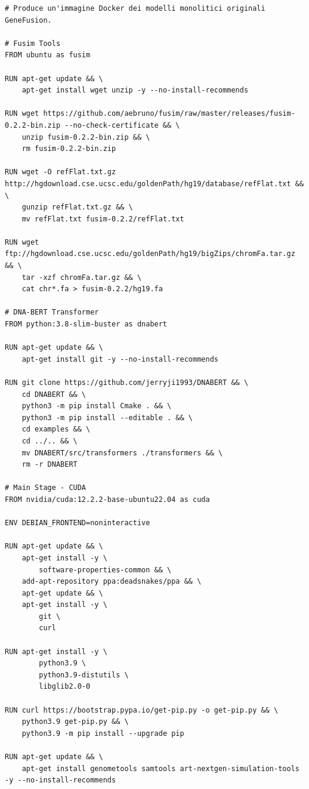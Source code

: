 \begin{code}
\label{code:apx:a:dockerfile}
\begin{verbatim}
# Produce un'immagine Docker dei modelli monolitici originali GeneFusion.

# Fusim Tools
FROM ubuntu as fusim

RUN apt-get update && \
    apt-get install wget unzip -y --no-install-recommends

RUN wget https://github.com/aebruno/fusim/raw/master/releases/fusim-0.2.2-bin.zip --no-check-certificate && \
    unzip fusim-0.2.2-bin.zip && \
    rm fusim-0.2.2-bin.zip

RUN wget -O refFlat.txt.gz http://hgdownload.cse.ucsc.edu/goldenPath/hg19/database/refFlat.txt && \
    gunzip refFlat.txt.gz && \
    mv refFlat.txt fusim-0.2.2/refFlat.txt

RUN wget ftp://hgdownload.cse.ucsc.edu/goldenPath/hg19/bigZips/chromFa.tar.gz && \
    tar -xzf chromFa.tar.gz && \
    cat chr*.fa > fusim-0.2.2/hg19.fa

# DNA-BERT Transformer
FROM python:3.8-slim-buster as dnabert

RUN apt-get update && \
    apt-get install git -y --no-install-recommends

RUN git clone https://github.com/jerryji1993/DNABERT && \
    cd DNABERT && \
    python3 -m pip install Cmake . && \
    python3 -m pip install --editable . && \
    cd examples && \
    cd ../.. && \
    mv DNABERT/src/transformers ./transformers && \
    rm -r DNABERT

# Main Stage - CUDA
FROM nvidia/cuda:12.2.2-base-ubuntu22.04 as cuda

ENV DEBIAN_FRONTEND=noninteractive

RUN apt-get update && \
    apt-get install -y \
        software-properties-common && \
    add-apt-repository ppa:deadsnakes/ppa && \
    apt-get update && \
    apt-get install -y \
        git \
        curl

RUN apt-get install -y \ 
        python3.9 \
        python3.9-distutils \
        libglib2.0-0

RUN curl https://bootstrap.pypa.io/get-pip.py -o get-pip.py && \
    python3.9 get-pip.py && \
    python3.9 -m pip install --upgrade pip

RUN apt-get update && \
    apt-get install genometools samtools art-nextgen-simulation-tools -y --no-install-recommends


\end{verbatim}
\end{code}
